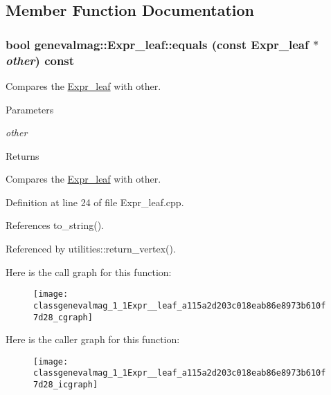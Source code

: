 \subsection{Member Function Documentation}
\hypertarget{classgenevalmag_1_1Expr__leaf_a115a2d203c018eab86e8973b610f7d28}{
\subsubsection[{equals}]{\setlength{\rightskip}{0pt plus 5cm}bool genevalmag::Expr\_\-leaf::equals (const {\bf Expr\_\-leaf} $\ast$ {\em other}) const}}
\label{classgenevalmag_1_1Expr__leaf_a115a2d203c018eab86e8973b610f7d28}
Compares the \hyperlink{classgenevalmag_1_1Expr__leaf}{Expr\_\-leaf} with other. 
\begin{DoxyParams}{Parameters}
\item[{\em other}]\end{DoxyParams}
\begin{DoxyReturn}{Returns}

\end{DoxyReturn}
Compares the \hyperlink{classgenevalmag_1_1Expr__leaf}{Expr\_\-leaf} with other. 

Definition at line 24 of file Expr\_\-leaf.cpp.



References to\_\-string().



Referenced by utilities::return\_\-vertex().



Here is the call graph for this function:\nopagebreak
\begin{figure}[H]
\begin{center}
\leavevmode
\texttt{[image: classgenevalmag\_1\_1Expr\_\_leaf\_a115a2d203c018eab86e8973b610f7d28\_cgraph]}
\end{center}
\end{figure}




Here is the caller graph for this function:\nopagebreak
\begin{figure}[H]
\begin{center}
\leavevmode
\texttt{[image: classgenevalmag\_1\_1Expr\_\_leaf\_a115a2d203c018eab86e8973b610f7d28\_icgraph]}
\end{center}
\end{figure}



